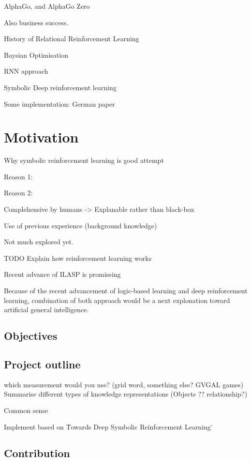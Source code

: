 \documentclass[12pt,twoside]{report}
\begin{document}
AlphaGo, and AlphaGo Zero

Also business success.

History of Relational Reinforcement Learning

Baysian Optimisation

RNN approach

Symbolic Deep reinforcement learning

Some implementation: German paper

\chapter{Motivation}

Why symbolic reinforcement learning is good attempt

Reason 1:

Reason 2:

Complehensive by humans -> Explanable rather than black-box

Use of previous experience (background knowledge)



Not much explored yet.

TODO Explain how reinforcement learning works


Recent advance of ILASP is promissing

Because of the recent advancement of logic-based learning and deep reinforcement learning, combination of both approach would be a next explonation toward artificial general intelligence.


\section{Objectives}

\section{Project outline}


which measurement would you use? (grid word, something else? GVGAL games)
Summarise different types of knowledge representations (Objects ?? relationship?)

Common sense

Implement based on \"Towards Deep Symbolic Reinforcement Learning \"

\section{Contribution}
\end{document}
